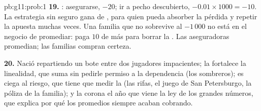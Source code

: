 \begin{solution}{pb:g11:prob:1}
\textbf{19.} : asegurarse, $-20$; ir a pecho descubierto,
$-0.01 \times 1000 = -10$. La estrategia sin seguro gana de , para
quien pueda absorber la pérdida y repetir la apuesta muchas veces. Una
familia que no sobrevive al $-1\,000$ no está en el negocio de promediar:
paga $10$ de más para borrar la . Las aseguradoras promedian; las
familias compran certeza.

\textbf{20.} Nació repartiendo un bote entre dos jugadores impacientes;
la fortalece la linealidad, que suma  sin pedirle permiso a la
dependencia (los sombreros); es ciega al riesgo, que tiene que medir la
 (las rifas, el juego de San Petersburgo, la póliza de la
familia); y la corona el año que viene la ley de los grandes números, que
explica por qué los promedios siempre acaban cobrando.
\end{solution}
